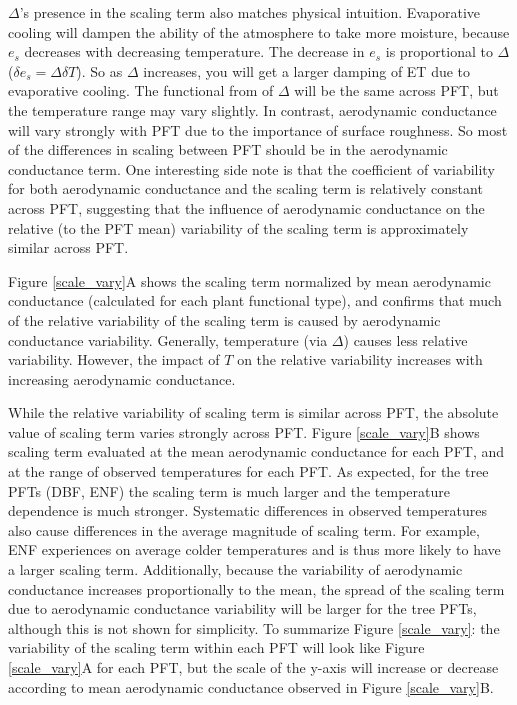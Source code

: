 \documentclass[draft,linenumbers]{agujournal}
\begin{document}
$\Delta$'s presence in the scaling term also matches physical intuition. Evaporative cooling will dampen the ability of the atmosphere to take more moisture, because $e_{s}$ decreases with decreasing temperature. The decrease in $e_{s}$ is proportional to $\Delta$ ($\delta e_{s} = \Delta \delta T$). So as $\Delta$ increases, you will get a larger damping of ET due to evaporative cooling.  The functional from of $\Delta$ will be the same across PFT, but the temperature range may vary slightly. In contrast, aerodynamic conductance will vary strongly with PFT due to the importance of surface roughness. So most of the differences in scaling between PFT should be in the aerodynamic conductance term. One interesting side note is that the coefficient of variability for both aerodynamic conductance and the scaling term is relatively constant across PFT, suggesting that the influence of aerodynamic conductance on the relative (to the PFT mean) variability of the scaling term is approximately similar across PFT.

Figure \ref{scale_vary}A shows the scaling term normalized by mean aerodynamic conductance (calculated for each plant functional type), and confirms that much of the relative variability of the scaling term is caused by aerodynamic conductance variability. Generally, temperature (via $\Delta$) causes less relative variability. However, the impact of $T$ on the relative variability increases with increasing aerodynamic conductance. 

While the relative variability of scaling term is similar across PFT, the absolute value of scaling term varies strongly across PFT. Figure \ref{scale_vary}B shows scaling term evaluated at the mean aerodynamic conductance for each PFT, and at the range of observed temperatures for each PFT. As expected, for the tree PFTs (DBF, ENF) the scaling term is much larger and the temperature dependence is much stronger. Systematic differences in observed temperatures also cause differences in the average magnitude of scaling term. For example, ENF experiences on average colder temperatures and is thus more likely to have a larger scaling term. Additionally, because the variability of aerodynamic conductance increases proportionally to the mean, the spread of the scaling term due to aerodynamic conductance variability will be larger for the tree PFTs, although this is not shown for simplicity. To summarize Figure \ref{scale_vary}: the variability of the scaling term within each PFT will look like Figure \ref{scale_vary}A for each PFT, but the scale of the y-axis will increase or decrease according to mean aerodynamic conductance observed in Figure \ref{scale_vary}B.
 
\end{document}
